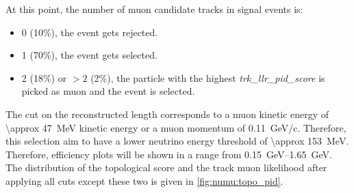 At this point, the number of muon candidate tracks in signal events is:

\begin{itemize}
    \item 0 (10\%), the event gets rejected.
    \item 1 (70\%), the event gets selected.
    \item 2 (18\%) or $>2$ (2\%), the particle with the highest \textit{trk\_llr\_pid\_score} is picked as muon and the event is selected.
\end{itemize}

The cut on the reconstructed length corresponds to a muon kinetic energy of \SI{\approx 47}{\MeV} kinetic energy or a muon momentum of \SI{0.11}{GeV/c}. Therefore, this selection aim to have a lower neutrino energy threshold of \SI{\approx 153}{\MeV}. Therefore, efficiency plots will be shown in a range from \SIrange{0.15}{1.65}{\GeV}.
The distribution of the topological score and the track muon likelihood after applying all cuts except these two is given in \cref{fig:numu:topo_pid}.



